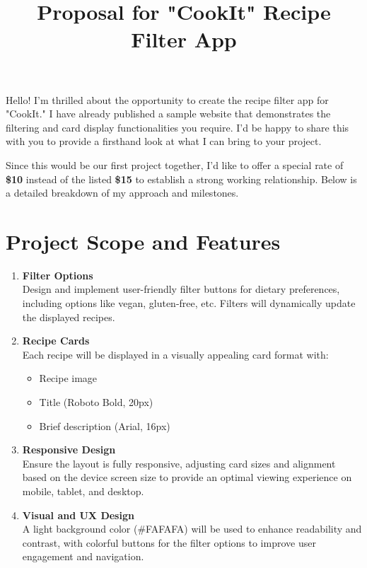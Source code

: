 \documentclass{article}
\title{\textbf{Proposal for "CookIt" Recipe Filter App}}
\author{}
\date{}
\begin{document}
\maketitle

\noindent
Hello! I’m thrilled about the opportunity to create the recipe filter app for "CookIt." I have already published a sample website that demonstrates the filtering and card display functionalities you require. I’d be happy to share this with you to provide a firsthand look at what I can bring to your project.

Since this would be our first project together, I’d like to offer a special rate of \textbf{\$10} instead of the listed \textbf{\$15} to establish a strong working relationship. Below is a detailed breakdown of my approach and milestones.

\section*{Project Scope and Features}

\begin{enumerate}[label=\arabic*.]
    \item \textbf{Filter Options} \\
    Design and implement user-friendly filter buttons for dietary preferences, including options like vegan, gluten-free, etc. Filters will dynamically update the displayed recipes.
    
    \item \textbf{Recipe Cards} \\
    Each recipe will be displayed in a visually appealing card format with:
    \begin{itemize}
        \item Recipe image
        \item Title (Roboto Bold, 20px)
        \item Brief description (Arial, 16px)
    \end{itemize}
    
    \item \textbf{Responsive Design} \\
    Ensure the layout is fully responsive, adjusting card sizes and alignment based on the device screen size to provide an optimal viewing experience on mobile, tablet, and desktop.
    
    \item \textbf{Visual and UX Design} \\
    A light background color (\#FAFAFA) will be used to enhance readability and contrast, with colorful buttons for the filter options to improve user engagement and navigation.
\end{enumerate}
\end{document}

